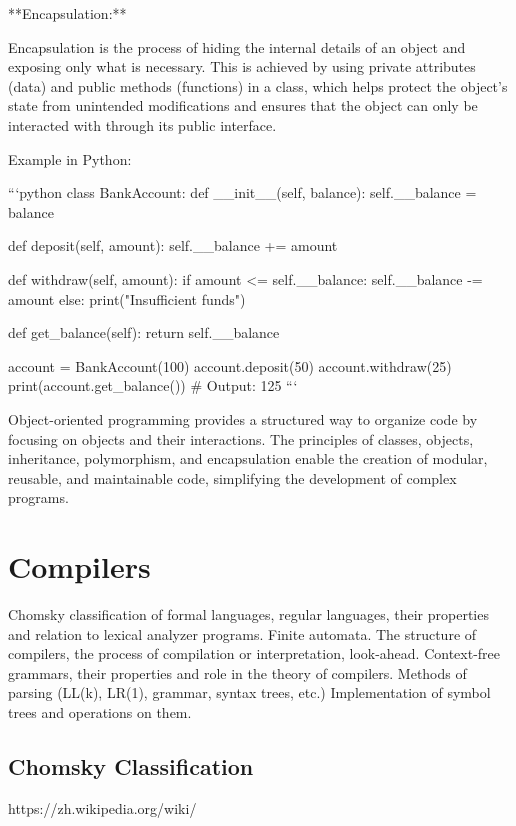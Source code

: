 \documentclass{article}
\begin{document}
**Encapsulation:**

Encapsulation is the process of hiding the internal details of an object and exposing only what is necessary. This is achieved by using private attributes (data) and public methods (functions) in a class, which helps protect the object's state from unintended modifications and ensures that the object can only be interacted with through its public interface.

Example in Python:

```python
class BankAccount:
    def __init__(self, balance):
        self.__balance = balance

    def deposit(self, amount):
        self.__balance += amount

    def withdraw(self, amount):
        if amount <= self.__balance:
            self.__balance -= amount
        else:
            print("Insufficient funds")

    def get_balance(self):
        return self.__balance

account = BankAccount(100)
account.deposit(50)
account.withdraw(25)
print(account.get_balance())  # Output: 125
```

Object-oriented programming provides a structured way to organize code by focusing on objects and their interactions. The principles of classes, objects, inheritance, polymorphism, and encapsulation enable the creation of modular, reusable, and maintainable code, simplifying the development of complex programs.


\section{Compilers}

Chomsky classification of formal languages, regular languages, their properties and relation to lexical analyzer programs. Finite automata. The structure of compilers, the process of compilation or interpretation, look-ahead. Context-free grammars, their properties and role in the theory of compilers. Methods of parsing (LL(k), LR(1), grammar, syntax trees, etc.) Implementation of symbol trees and operations on them.


\subsection{Chomsky Classification}

https://zh.wikipedia.org/wiki/%
\end{document}

